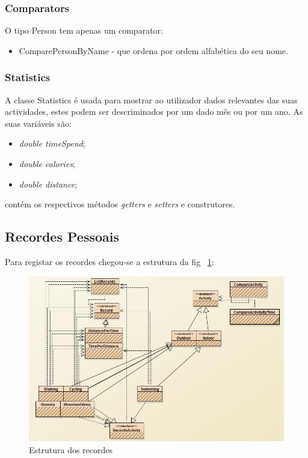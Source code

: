 \documentclass[12pt,notitlepage]{article}
\begin{document}
\subsubsection{Comparators}
O tipo Person tem apenas um comparator:
\begin{itemize}
\item ComparePersonByName - que ordena por ordem alfabética do seu nome.
\end{itemize}
\subsubsection{Statistics}

A classe Statistics é usada para mostrar ao utilizador dados relevantes das suas actividades, estes podem ser descriminados por um dado mês ou por um ano. As suas variáveis são:
\begin{itemize}
\item \textit{double timeSpend};
\item \textit{double calories};
\item \textit{double distance};
\end{itemize}
contém os respectivos métodos \textit{getters} e \textit{setters} e construtores.


\subsection{Recordes Pessoais}
Para registar os recordes chegou-se a estrutura da fig ~\ref{fig:recordes}:
~\\
\begin{figure}[h]
\centering
\includegraphics[scale=0.6]{Records.jpg}
\caption{Estrutura dos recordes}
\label{fig:recordes}
\end{figure}
\end{document}
